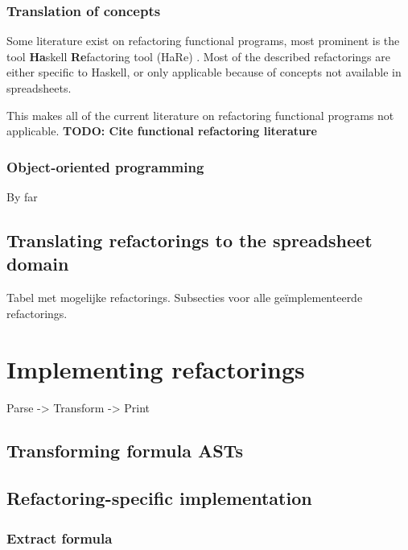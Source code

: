 \documentclass[12pt,a4paper,onecolumn,oneside]{memoir}
\newcommand{\todo}[1]{\textbf{TODO: #1}}
\begin{document}
\subsection{Translation of concepts}

Some literature exist on refactoring functional programs, most prominent is the tool \textbf{Ha}skell \textbf{Re}factoring tool (HaRe) \cite{thompson2005refactoring}.
Most of the described refactorings are either specific to Haskell, or only applicable because of concepts not available in spreadsheets.

This makes all of the current literature on refactoring functional programs not applicable.
\todo{Cite functional refactoring literature}

\subsection{Object-oriented programming}

By far 



\section{Translating refactorings to the spreadsheet domain}

Tabel met mogelijke refactorings.
Subsecties voor alle geïmplementeerde refactorings.



\chapter{Implementing refactorings}

Parse -> Transform -> Print

\section{Transforming formula ASTs}

\section{Refactoring-specific implementation}

\subsection{Extract formula}
\end{document}
